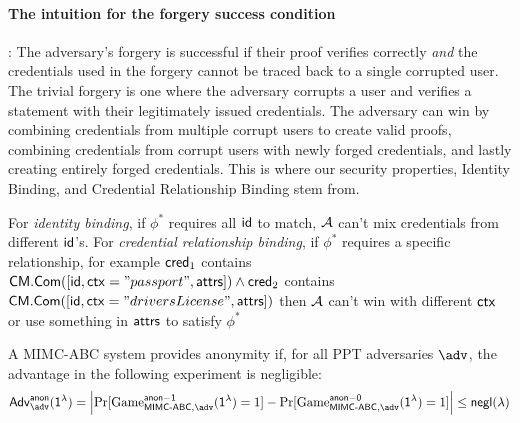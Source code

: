 \paragraph{The intuition for the forgery success condition}: The adversary's forgery is successful if their proof verifies correctly \emph{and} the credentials used in the forgery cannot be traced back to a single corrupted user. The trivial forgery is one where the adversary corrupts a user and verifies a statement with their legitimately issued credentials. The adversary can win by combining credentials from multiple corrupt users to create valid proofs, combining credentials from corrupt users with newly forged credentials, and lastly creating entirely forged credentials. This is where our security properties, Identity Binding, and Credential Relationship Binding stem from.

\begin{remark}
    For \emph{identity binding}, if $\phi^*$ requires all $\mathsf{id}$ to match, $\mathcal{A}$ can't mix credentials from different $\mathsf{id}$'s. For \emph{credential relationship binding}, if $\phi^*$ requires a specific relationship, for example $\mathsf{cred}_1$ contains $\mathsf{CM.Com}([\mathsf{id}, \mathsf{ctx}="passport", \mathsf{attrs}]) \wedge \mathsf{cred}_2$ contains $\mathsf{CM.Com}([\mathsf{id}, \mathsf{ctx}="driversLicense", \mathsf{attrs}])$ then $\mathcal{A}$ can't win with different $\mathsf{ctx}$ or use something in $\mathsf{attrs}$ to satisfy $\phi^*$
    
\end{remark}



\begin{definition}
A MIMC-ABC system provides anonymity if, for all PPT adversaries $\adv$, the advantage in the following experiment is negligible:
\[
\mathsf{Adv}^{\mathsf{anon}}_{\adv}(\secparam) = \left| \Pr[\mathrm{Game}^{\mathsf{anon-1}}_{\MIMCABC, \adv}(\secparam) = 1] - \Pr[\mathrm{Game}^{\mathsf{anon-0}}_{\MIMCABC, \adv}(\secparam) = 1] \right| \leq \negl(\lambda)
\]
\end{definition}

